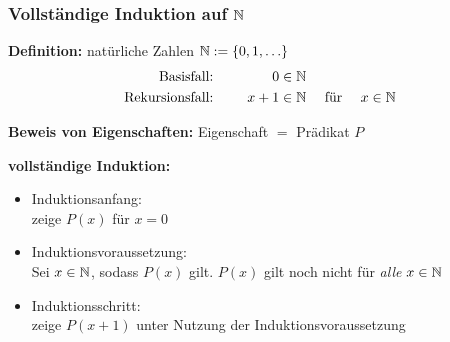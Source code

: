 \documentclass{beamer}
\begin{document}
\begin{frame} \frametitle{Vollständige Induktion auf $\mathbb{N}$}
	\footnotesize
	
	\textbf{Definition:} natürliche Zahlen $\N \defeq \menge{0, 1, \dots}$
	\begin{equation*}
		\begin{aligned}
			\text{Basisfall: } \quad &&0 &\in \mathbb{N} \\
			\text{Rekursionsfall: }\quad &&x + 1 &\in \mathbb{N}
			\quad \text{ für } \quad x \in \mathbb{N}
		\end{aligned}
	\end{equation*}
	
	\textbf{Beweis von Eigenschaften:}
	Eigenschaft $=$ Prädikat $P$
	\begin{center}
	\end{center}
	
	\textbf{vollständige Induktion:}
	\begin{itemize}
		\item \textcolor{cdblue}{Induktionsanfang}: \\
		zeige $P(x)$ für $x = 0$
		\item \textcolor{cdblue}{Induktionsvoraussetzung}:\\
		Sei $x \in \mathbb{N}$, sodass $P(x)$ gilt.
		\hfill
		\textcolor{cdgray}{$P(x)$ gilt noch nicht für \textit{alle} $x \in \mathbb{N}$}
		\item \textcolor{cdblue}{Induktionsschritt}: \\
		zeige $P(x+1)$ unter Nutzung der Induktionsvoraussetzung
	\end{itemize}
\end{frame}
\end{document}

